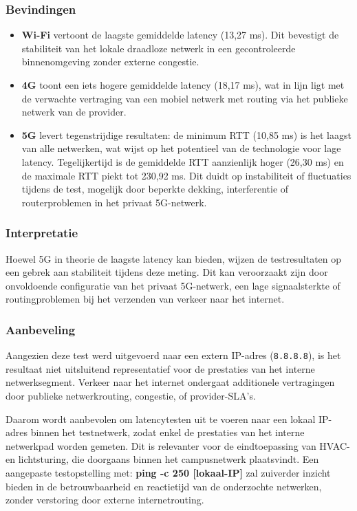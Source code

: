 \subsubsection{Bevindingen}
\begin{itemize}
    \item \textbf{Wi-Fi} vertoont de laagste gemiddelde latency (13,27 ms). Dit bevestigt de stabiliteit van het lokale draadloze netwerk in een gecontroleerde binnenomgeving zonder externe congestie.
    
    \item \textbf{4G} toont een iets hogere gemiddelde latency (18,17 ms), wat in lijn ligt met de verwachte vertraging van een mobiel netwerk met routing via het publieke netwerk van de provider.
    
    \item \textbf{5G} levert tegenstrijdige resultaten: de minimum RTT (10,85 ms) is het laagst van alle netwerken, wat wijst op het potentieel van de technologie voor lage latency. Tegelijkertijd is de gemiddelde RTT aanzienlijk hoger (26,30 ms) en de maximale RTT piekt tot 230,92 ms. Dit duidt op instabiliteit of fluctuaties tijdens de test, mogelijk door beperkte dekking, interferentie of routerproblemen in het privaat 5G-netwerk.
\end{itemize}

\subsubsection{Interpretatie}
Hoewel 5G in theorie de laagste latency kan bieden, wijzen de testresultaten op een gebrek aan stabiliteit tijdens deze meting. Dit kan veroorzaakt zijn door onvoldoende configuratie van het privaat 5G-netwerk, een lage signaalsterkte of routingproblemen bij het verzenden van verkeer naar het internet.

\subsubsection{Aanbeveling}
Aangezien deze test werd uitgevoerd naar een extern IP-adres (\texttt{8.8.8.8}), is het resultaat niet uitsluitend representatief voor de prestaties van het interne netwerksegment. Verkeer naar het internet ondergaat additionele vertragingen door publieke netwerkrouting, congestie, of provider-SLA’s.

Daarom wordt aanbevolen om latencytesten uit te voeren naar een lokaal IP-adres binnen het testnetwerk, zodat enkel de prestaties van het interne netwerkpad worden gemeten. Dit is relevanter voor de eindtoepassing van HVAC- en lichtsturing, die doorgaans binnen het campusnetwerk plaatsvindt. Een aangepaste testopstelling met: \textbf{ping -c 250 [lokaal-IP]} zal zuiverder inzicht bieden in de betrouwbaarheid en reactietijd van de onderzochte netwerken, zonder verstoring door externe internetrouting.

